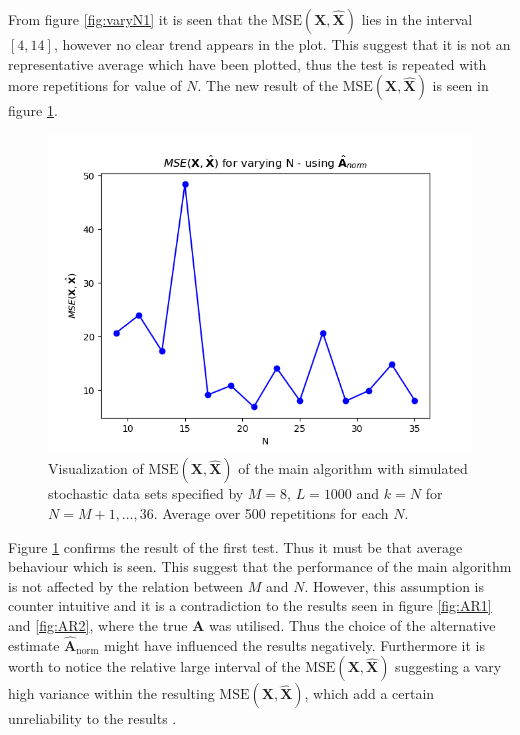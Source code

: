\noindent
From figure \ref{fig:varyN1} it is seen that the $\text{MSE}(\mathbf{X}, \hat{\mathbf{X}})$ lies in the interval $[4,14]$, however no clear trend appears in the plot. 
This suggest that it is not an representative average which have been plotted, thus the test is repeated with more repetitions for value of $N$. The new result of the $\text{MSE}(\mathbf{X}, \hat{\mathbf{X}})$ is seen in figure \ref{fig:varyN2}.
\begin{figure}[H]
    \centering
	\includegraphics[scale=0.5]{figures/ch_6/varyN2.png}
	\caption{Visualization of $\text{MSE}(\mathbf{X}, \hat{\mathbf{X}})$ of the main algorithm with simulated stochastic data sets specified by $M = 8$, $L=1000$ and $k = N$ for $N = M+1, \hdots , 36$. Average over 500 repetitions for each $N$.}
	\label{fig:varyN2}
\end{figure}  
\noindent
Figure \ref{fig:varyN2} confirms the result of the first test. Thus it must be that average behaviour which is seen. 
This suggest that the performance of the main algorithm is not affected by the relation between $M$ and $N$.
However, this assumption is counter intuitive and it is a contradiction to the results seen in figure \ref{fig:AR1} and \ref{fig:AR2}, where the true $\mathbf{A}$ was utilised. 
Thus the choice of the alternative estimate $\hat{\mathbf{A}}_{\text{norm}}$ might have influenced the results negatively.  
Furthermore it is worth to notice the relative large interval of the $\text{MSE}(\mathbf{X}, \hat{\mathbf{X}})$ suggesting a vary high variance within the resulting $\text{MSE}(\mathbf{X}, \hat{\mathbf{X}})$, which add a certain unreliability to the results .    